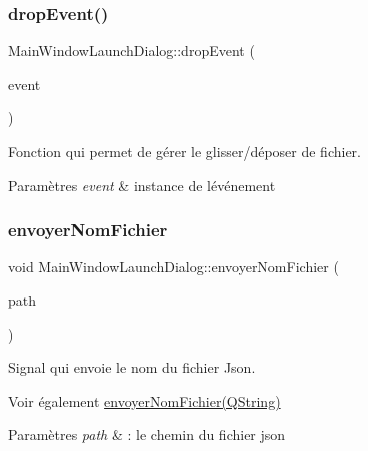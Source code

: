 \subsubsection{\texorpdfstring{drop\+Event()}{dropEvent()}}
{\footnotesize\ttfamily Main\+Window\+Launch\+Dialog\+::drop\+Event (\begin{DoxyParamCaption}\item[{Q\+Drop\+Event $\ast$}]{event }\end{DoxyParamCaption})\hspace{0.3cm}{\ttfamily [private]}}



Fonction qui permet de gérer le glisser/déposer de fichier. 


\begin{DoxyParams}{Paramètres}
{\em event} & instance de l\textquotesingle{}événement \\
\hline
\end{DoxyParams}
\mbox{\label{classMainWindowLaunchDialog_a290aac8c91df612c4aeea9e4ba4a0897}} 
\subsubsection{\texorpdfstring{envoyer\+Nom\+Fichier}{envoyerNomFichier}}
{\footnotesize\ttfamily void Main\+Window\+Launch\+Dialog\+::envoyer\+Nom\+Fichier (\begin{DoxyParamCaption}\item[{Q\+String}]{path }\end{DoxyParamCaption})\hspace{0.3cm}{\ttfamily [signal]}}



Signal qui envoie le nom du fichier Json. 

\begin{DoxySeeAlso}{Voir également}
\hyperlink{classMainWindowLaunchDialog_a290aac8c91df612c4aeea9e4ba4a0897}{envoyer\+Nom\+Fichier(\+Q\+String)} 
\end{DoxySeeAlso}

\begin{DoxyParams}{Paramètres}
{\em path} & \+: le chemin du fichier json \\
\hline
\end{DoxyParams}
\mbox{\label{classMainWindowLaunchDialog_a91bfa59302a3591b7b3b11b03d6f9b0e}} 
